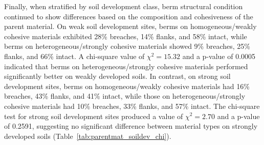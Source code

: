 \documentclass[review]{elsarticle}
\begin{document}

Finally, when stratified by soil development class, berm structural condition continued to show differences based on the composition and cohesiveness of the parent material. On weak soil development sites, berms on homogeneous/weakly cohesive materials exhibited 28\% breaches, 14\% flanks, and 58\% intact, while berms on heterogeneous/strongly cohesive materials showed 9\% breaches, 25\% flanks, and 66\% intact. A chi-square value of $\chi^2 = 15.32$ and a p-value of 0.0005 indicated that berms on heterogeneous/strongly cohesive materials performed significantly better on weakly developed soils. In contrast, on strong soil development sites, berms on homogeneous/weakly cohesive materials had 16\% breaches, 43\% flanks, and 41\% intact, while those on heterogeneous/strongly cohesive materials had 10\% breaches, 33\% flanks, and 57\% intact. The chi-square test for strong soil development sites produced a value of $\chi^2 = 2.70$ and a p-value of 0.2591, suggesting no significant difference between material types on strongly developed soils (Table~\ref{tab:parentmat_soildev_chi}).
\end{document}

